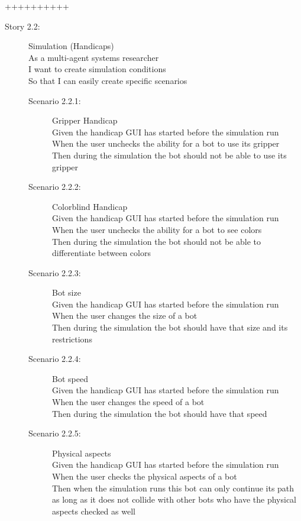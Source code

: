 ++++++++++\documentclass{article}
\begin{document}
\begin{description}
	\item[Story 2.2:] Simulation (Handicaps)\\
	As a multi-agent systems researcher\\
	I want to create simulation conditions\\
	So that I can easily create specific scenarios
	
	\begin{description}
		\item[Scenario 2.2.1:] Gripper Handicap\\
		Given the handicap GUI has started before the simulation run\\
		When the user unchecks the ability for a bot to use its gripper\\
		Then during the simulation the bot should not be able to use its gripper

		\item[Scenario 2.2.2:] Colorblind Handicap\\
		Given the handicap GUI has started before the simulation run\\
		When the user unchecks the ability for a bot to see colors\\
		Then during the simulation the bot should not be able to differentiate between colors

		\item[Scenario 2.2.3:] Bot size\\
		Given the handicap GUI has started before the simulation run\\
		When the user changes the size of a bot\\
		Then during the simulation the bot should have that size and its restrictions

		\item[Scenario 2.2.4:] Bot speed\\
		Given the handicap GUI has started before the simulation run\\
		When the user changes the speed of a bot\\
		Then during the simulation the bot should have that speed

		\item[Scenario 2.2.5:] Physical aspects\\
		Given the handicap GUI has started before the simulation run\\
		When the user checks the physical aspects of a bot\\
		Then when the simulation runs this bot can only continue its path as long as it does not collide with other bots who have the physical aspects checked as well
	\end{description}
\end{description}
\end{document}
